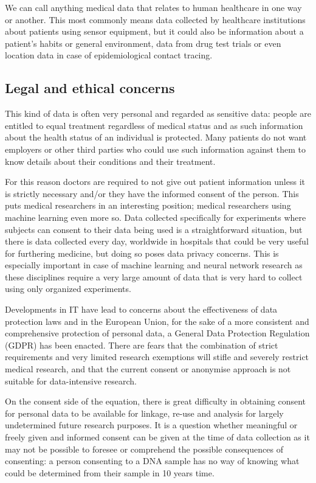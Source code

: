 	We can call anything medical data that relates to human healthcare in one way or another. This most commonly means data collected by healthcare institutions about patients using sensor equipment, but it could also be information about a patient's habits or general environment, data from drug test trials or even location data in case of epidemiological contact tracing. 
	
	\subsection{Legal and ethical concerns}
	
	This kind of data is often very personal and regarded as sensitive data: people are entitled to equal treatment regardless of medical status and as such information about the health status of an individual is protected. Many patients do not want employers or other third parties who could use such information against them to know details about their conditions and their treatment.
	
	For this reason doctors are required to not give out patient information unless it is strictly necessary and/or they have the informed consent of the person. This puts medical researchers in an interesting position; medical researchers using machine learning even more so. Data collected specifically for experiments where subjects can consent to their data being used is a straightforward situation, but there is data collected every day, worldwide in hospitals that could be very useful for furthering medicine, but doing so poses data privacy concerns. This is especially important in case of machine learning and neural network research as these disciplines require a very large amount of data that is very hard to collect using only organized experiments.
	
	Developments in IT have lead to concerns about the effectiveness of data protection laws and in the European Union, for the sake of a more consistent and comprehensive protection of personal data, a General Data Protection Regulation (GDPR) has been enacted\cite{GDPR2016a}. There are fears that the combination of strict requirements and very limited research exemptions will stifle and severely restrict medical research, and that the current consent or anonymise approach is not suitable for data-intensive research\cite{mostert2016big}. 
	
	On the consent side of the equation, there is great difficulty in obtaining consent for personal data to be available for linkage, re-use and analysis for largely undetermined future research purposes\cite{anderson2015collection}. It is a question whether meaningful or freely given and informed consent can be given at the time of data collection as it may not be possible to foresee or comprehend the possible consequences of consenting: a person consenting to a DNA sample has no way of knowing what could be determined from their sample in 10 years time.
	
